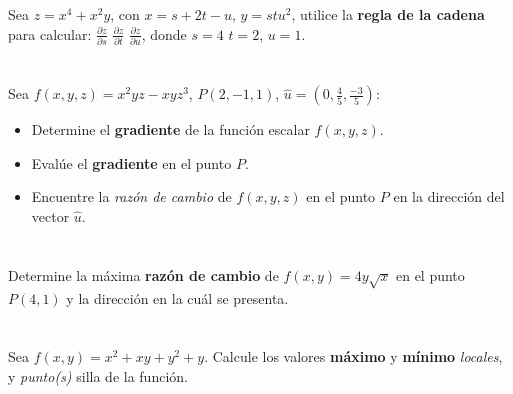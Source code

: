 \documentclass[12pt]{article}
\begin{document}
\section{}

Sea $z = x^4 + x^2y$, con $x = s + 2t − u$, $y = stu^2$, utilice la \textbf{regla de la cadena} para calcular: $\frac{\partial z}{\partial s}$ $\frac{\partial z}{\partial t}$ $\frac{\partial z}{\partial u}$, donde $s=4$ $t=2$, $u=1$.

\section{}

Sea $f(x, y, z) = x^2yz - xyz^3$, $P(2, -1, 1)$, $\hat{u} = \left (0,\frac{4}{5},\frac{-3}{5} \right)$:

\begin{itemize}[format=\textbf]
  
\item Determine el \textbf{gradiente} de la función escalar $f(x, y, z)$.

\item Evalúe el \textbf{gradiente} en el punto $P$.

\item Encuentre la \textit{razón de cambio} de $f(x, y, z)$ en el punto $P$ en la dirección del vector $\hat{u}$.
\end{itemize}

\section{}

Determine la máxima \textbf{razón de cambio} de $f(x, y) = 4y\sqrt{x}$ en el punto $P(4, 1)$ y la dirección en la cuál se presenta.

\section{}

Sea $f(x, y) = x^2 + xy + y^2 + y$. Calcule los valores \textbf{máximo} y \textbf{mínimo} \textit{locales}, y \textit{punto(s)} silla de la función.
\end{document}
